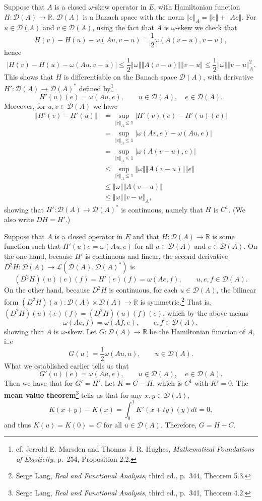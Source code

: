 \documentclass{article}
\newcommand{\norm}[1]{\left\Vert #1 \right\Vert}
\theoremstyle{definition}
\theoremstyle{definition}
\begin{document}
Suppose that $A$ is a closed $\omega$-skew operator in $E$, with Hamiltonian function
$H:\mathscr{D}(A) \to \mathbb{R}$. $\mathscr{D}(A)$ is a Banach space with the norm
$\norm{e}_A = \norm{e}+\norm{Ae}$.
For $u \in \mathscr{D}(A)$
and $v \in \mathscr{D}(A)$, using the fact that $A$ is $\omega$-skew we check that
\[
H(v)-H(u)-\omega(Au,v-u) = \frac{1}{2}\omega(A(v-u),v-u),
\]
hence
\[
|H(v)-H(u) - \omega(Au,v-u)| \leq \frac{1}{2}\norm{\omega} \norm{A(v-u)} \norm{v-u}
\leq \frac{1}{2}\norm{\omega} \norm{v-u}_A^2.
\]
This shows that $H$ is differentiable on the Banach space $\mathscr{D}(A)$, with derivative
$H':\mathscr{D}(A) \to \mathscr{D}(A)^*$ defined by\footnote{cf.
Jerrold E. Marsden and Thomas J. R. Hughes, {\em Mathematical Foundations of Elasticity}, p.~254, Proposition 2.2.}
\[
H'(u)(e) = \omega(Au,e), \qquad u \in \mathscr{D}(A), \quad e \in \mathscr{D}(A).
\]
Moreover, for $u, v \in \mathscr{D}(A)$ we have
\begin{align*}
\norm{H'(v)-H'(u)} &= \sup_{\norm{e}_A \leq 1}
|H'(v)(e)-H'(u)(e)|\\
&= \sup_{\norm{e}_A \leq 1} |\omega(Av,e)-\omega(Au,e)|\\
&= \sup_{\norm{e}_A \leq 1} |\omega(A(v-u),e)|\\
&\leq \sup_{\norm{e}_A \leq 1} \norm{\omega} \norm{A(v-u)} \norm{e}\\
&\leq \norm{\omega} \norm{A(v-u)}\\
&\leq \norm{\omega} \norm{v-u}_A,
\end{align*}
showing that $H':\mathscr{D}(A) \to \mathscr{D}(A)^*$ is continuous, namely
that $H$ is $C^1$.
(We also write $DH=H'$.)

Suppose that $A$ is a closed  operator in $E$ and that $H:\mathscr{D}(A) \to \mathbb{R}$ is some function
such that
$H'(u)e=\omega(Au,e)$ for all $u \in \mathscr{D}(A)$ and $e \in \mathscr{D}(A)$.
On the one hand, because $H'$ is continuous and linear, the second derivative $D^2 H:\mathscr{D}(A) \to \mathscr{L}(\mathscr{D}(A),\mathscr{D}(A)^*)$  is
\[
(D^2H)(u)(e)(f) = H'(e)(f) =\omega(Ae,f), \qquad u, e, f \in \mathscr{D}(A).
\]
On the other hand, because $D^2 H$ is continuous, for each $u \in \mathscr{D}(A)$, the bilinear form $(D^2H)(u):\mathscr{D}(A) \times
\mathscr{D}(A) \to \mathbb{R}$ is symmetric.\footnote{Serge Lang, {\em Real and Functional Analysis}, third ed., p.~344, Theorem 5.3.}
That is, $(D^2H)(u)(e)(f)=(D^2H)(u)(f)(e)$, which by the above means
\[
\omega(Ae,f)=\omega(Af,e), \qquad e,f \in \mathscr{D}(A),
\]
showing that $A$ is $\omega$-skew. Let $G:\mathscr{D}(A) \to \mathbb{R}$ be the Hamiltonian function of $A$, i..e
\[
G(u) = \frac{1}{2}\omega(Au,u), \qquad u \in \mathscr{D}(A).
\]
What we established earlier tells us that
\[
G'(u)(e)=\omega(Au,e), \qquad u \in \mathscr{D}(A), \quad e \in \mathscr{D}(A).
\]
Then we have that for $G'=H'$. Let $K=G-H$, which is $C^1$ with  $K'=0$. The
\textbf{mean value theorem}\footnote{Serge Lang, {\em Real and Functional Analysis}, third ed., p.~341, Theorem 4.2.} tells us that
for any $x,y \in \mathscr{D}(A)$,
\[
K(x+y)-K(x) = \int_0^1 K'(x+ty)(y) dt = 0,
\]
and thus $K(u)=K(0)=C$ for all $u \in \mathscr{D}(A)$. Therefore, 
$G=H+C$. 
\end{document}
